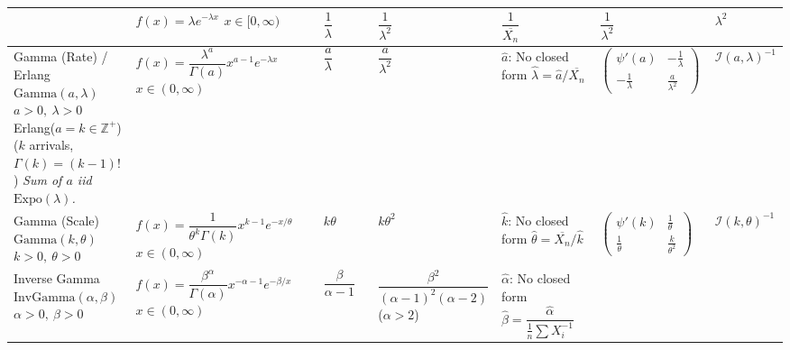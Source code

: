 \documentclass[8pt,a4paper]{extarticle}
\newcommand{\1}{\mathds{1}}
\begin{document}
\begin{table}[htpb]
{\begin{tabular}{@{}m{0.16\linewidth}m{0.26\linewidth}m{0.08\linewidth}m{0.14\linewidth}m{0.14\linewidth}m{0.15\linewidth}m{0.12\linewidth}@{}}
    & $f(x)=\lambda e^{-\lambda x}$ \newline $x\in[0,\infty)$
    & $\dfrac{1}{\lambda}$ & $\dfrac{1}{\lambda^2}$
    & $\dfrac{1}{\overline{X_n}}$
    & $\dfrac{1}{\lambda^2}$
    & $\lambda^2$
    \\ \hline
    Gamma (Rate) / Erlang \newline $\mathrm{Gamma}(a,\lambda)$ \newline $a > 0,\ \lambda > 0$ \newline  Erlang($a = k \in \mathbb{Z}^+$) \newline ($k$ arrivals, $\Gamma(k)=(k-1)!$) \newline \scriptsize\textit{Sum of $a$ iid $\mathrm{Expo}(\lambda)$.}
    & $f(x)=\dfrac{\lambda^a}{\Gamma(a)}x^{a-1}e^{-\lambda x}$ \newline $x\in(0,\infty)$
    & $\dfrac{a}{\lambda}$ & $\dfrac{a}{\lambda^2}$
    & $\hat{a}$: No closed form \newline $\hat{\lambda}=\hat{a}/\overline{X_n}$
    & $\begin{pmatrix} \psi'(a) & -\frac{1}{\lambda} \\ -\frac{1}{\lambda} & \frac{a}{\lambda^2} \end{pmatrix}$
    & $\mathcal{I}(a,\lambda)^{-1}$
    \\ \hline
    Gamma (Scale) \newline $\mathrm{Gamma}(k,\theta)$ \newline $k > 0,\ \theta > 0$
    & $f(x)=\dfrac{1}{\theta^k\Gamma(k)}x^{k-1}e^{-x/\theta}$ \newline $x\in(0,\infty)$
    & $k\theta$ & $k\theta^2$
    & $\hat{k}$: No closed form \newline $\hat{\theta}=\overline{X_n}/\hat{k}$
    & $\begin{pmatrix} \psi'(k) & \frac{1}{\theta} \\ \frac{1}{\theta} & \frac{k}{\theta^2} \end{pmatrix}$
    & $\mathcal{I}(k,\theta)^{-1}$
    \\ \hline
    Inverse Gamma \newline $\mathrm{InvGamma}(\alpha,\beta)$ \newline $\alpha > 0,\ \beta > 0$
    & $f(x)=\dfrac{\beta^\alpha}{\Gamma(\alpha)}x^{-\alpha-1}e^{-\beta/x}$ \newline $x\in(0,\infty)$
    & $\dfrac{\beta}{\alpha-1}$ & $\dfrac{\beta^2}{(\alpha-1)^2(\alpha-2)}$ \newline ($\alpha>2$)
    & $\hat{\alpha}$: No closed form \newline $\hat{\beta}=\dfrac{\hat{\alpha}}{\frac{1}{n}\sum X_i^{-1}}$

\end{tabular}}
\end{table}
\end{document}
